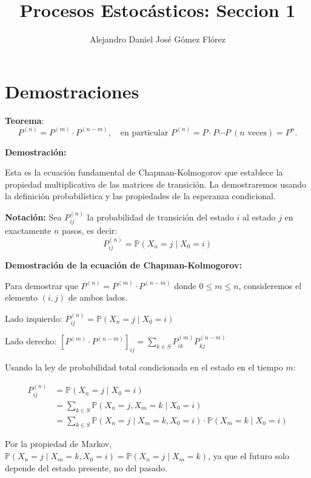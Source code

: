 \documentclass[12pt,a4paper]{article}
\title{Procesos Estocásticos: Seccion 1}
\author{Alejandro Daniel José Gómez Flórez}
\date{}
\newcommand{\teorema}[1]{%
\begin{teoremabox}
\textbf{Teorema}: #1
\end{teoremabox}
}
\begin{document}
\maketitle

\section{Demostraciones}


\teorema{
\begin{equation*}
P^{(n)} = P^{(m)} \cdot P^{(n-m)}, \quad \text{en particular } P^{(n)} = P \cdot P \cdots P \ (\text{$n$ veces}) = P^n.
\end{equation*}}

\textbf{Demostración:}

Esta es la ecuación fundamental de Chapman-Kolmogorov que establece la propiedad multiplicativa de las matrices de transición. La demostraremos usando la definición probabilística y las propiedades de la esperanza condicional.

\textbf{Notación:} Sea $P_{ij}^{(n)}$ la probabilidad de transición del estado $i$ al estado $j$ en exactamente $n$ pasos, es decir:
\begin{equation*}
P_{ij}^{(n)} = \mathbb{P}(X_n = j \mid X_0 = i)
\end{equation*}

\textbf{Demostración de la ecuación de Chapman-Kolmogorov:}

Para demostrar que $P^{(n)} = P^{(m)} \cdot P^{(n-m)}$ donde $0 \leq m \leq n$, consideremos el elemento $(i,j)$ de ambos lados.

Lado izquierdo: $P_{ij}^{(n)} = \mathbb{P}(X_n = j \mid X_0 = i)$

Lado derecho: $[P^{(m)} \cdot P^{(n-m)}]_{ij} = \sum_{k \in S} P_{ik}^{(m)} P_{kj}^{(n-m)}$

Usando la ley de probabilidad total condicionada en el estado en el tiempo $m$:

\begin{align*}
P_{ij}^{(n)} &= \mathbb{P}(X_n = j \mid X_0 = i) \\
&= \sum_{k \in S} \mathbb{P}(X_n = j, X_m = k \mid X_0 = i) \\
&= \sum_{k \in S} \mathbb{P}(X_n = j \mid X_m = k, X_0 = i) \cdot \mathbb{P}(X_m = k \mid X_0 = i)
\end{align*}

Por la propiedad de Markov, $\mathbb{P}(X_n = j \mid X_m = k, X_0 = i) = \mathbb{P}(X_n = j \mid X_m = k)$, ya que el futuro solo depende del estado presente, no del pasado.
\end{document}
